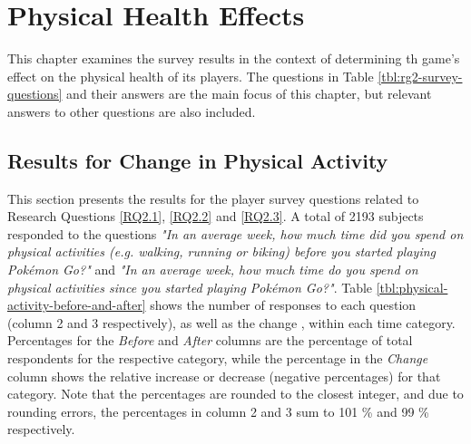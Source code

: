 \chapter{Physical Health Effects}
\label{chapter:player-study-physical}

This chapter examines the survey results in the context of determining th game's effect on the physical health of its players. The questions in Table \ref{tbl:rg2-survey-questions} and their answers are the main focus of this chapter, but relevant answers to other questions are also included.

\section{Results for Change in Physical Activity}

This section presents the results for the player survey questions related to Research Questions \ref{RQ2.1}, \ref{RQ2.2} and \ref{RQ2.3}. A total of 2193 subjects responded to the questions \emph{"In an average week, how much time did you spend on physical activities (e.g. walking, running or biking) before you started playing Pokémon Go?"} and \emph{"In an average week, how much time do you spend on physical activities since you started playing Pokémon Go?"}. Table \ref{tbl:physical-activity-before-and-after} shows the number of responses to each question (column 2 and 3 respectively), as well as the change , within each time category. Percentages for the \emph{Before} and \emph{After} columns are the percentage of total respondents for the respective category, while the percentage in the \emph{Change} column shows the relative increase or decrease (negative percentages) for that category. Note that the percentages are rounded to the closest integer, and due to rounding errors, the percentages in column 2 and 3 sum to 101 \% and 99 \% respectively.

